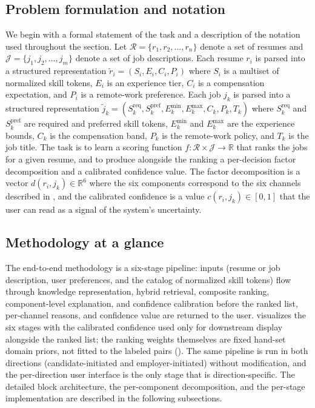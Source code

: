\subsection{Problem formulation and notation}\label{sec:3.1}
We begin with a formal statement of the task and a description of the notation used throughout the section.
Let $\mathcal{R} = \{r_1, r_2, \ldots, r_n\}$ denote a set of resumes and $\mathcal{J} = \{j_1, j_2, \ldots, j_m\}$ denote a set of job descriptions.
Each resume $r_i$ is parsed into a structured representation $\tilde{r}_i = (S_i, E_i, C_i, P_i)$ where $S_i$ is a multiset of normalized skill tokens, $E_i$ is an experience tier, $C_i$ is a compensation expectation, and $P_i$ is a remote-work preference.
Each job $j_k$ is parsed into a structured representation $\tilde{j}_k = (S_k^{\text{req}}, S_k^{\text{pref}}, E_k^{\min}, E_k^{\max}, C_k, P_k, T_k)$ where $S_k^{\text{req}}$ and $S_k^{\text{pref}}$ are required and preferred skill tokens, $E_k^{\min}$ and $E_k^{\max}$ are the experience bounds, $C_k$ is the compensation band, $P_k$ is the remote-work policy, and $T_k$ is the job title.
The task is to learn a scoring function $f: \mathcal{R} \times \mathcal{J} \to \mathbb{R}$ that ranks the jobs for a given resume, and to produce alongside the ranking a per-decision factor decomposition and a calibrated confidence value.
The factor decomposition is a vector $d(r_i, j_k) \in \mathbb{R}^6$ where the six components correspond to the six channels described in , and the calibrated confidence is a value $c(r_i, j_k) \in [0, 1]$ that the user can read as a signal of the system's uncertainty.

\subsection{Methodology at a glance}\label{sec:3.2}
The end-to-end methodology is a six-stage pipeline: inputs (resume or job description, user preferences, and the catalog of normalized skill tokens) flow through knowledge representation, hybrid retrieval, composite ranking, component-level explanation, and confidence calibration before the ranked list, per-channel reasons, and confidence value are returned to the user.
 visualizes the six stages with the calibrated confidence used only for downstream display alongside the ranked list; the ranking weights themselves are fixed hand-set domain priors, not fitted to the labeled pairs ().
The same pipeline is run in both directions (candidate-initiated and employer-initiated) without modification, and the per-direction user interface is the only stage that is direction-specific.
The detailed block architecture, the per-component decomposition, and the per-stage implementation are described in the following subsections.

